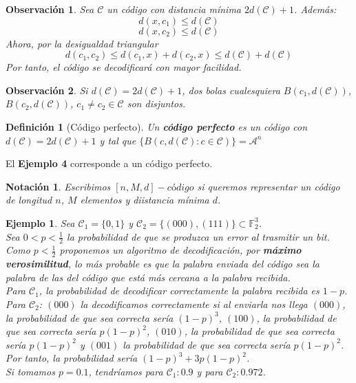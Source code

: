 \documentclass[spanish]{book}
\newtheorem{mydef}{Definición}
\newtheorem{nota}{Notación}
\newtheorem{ejem}{Ejemplo}
\newtheorem{obsv}{Observación}
\begin{document}
\begin{obsv}
	Sea $\mathcal{C}$ un código con distancia mínima $2d(\mathcal{C})+1$.
	Además:
	$$ d(x, c_1) \leq d(\mathcal{C}) $$
	$$ d(x, c_2) \leq d(\mathcal{C}) $$
	Ahora, por la desigualdad triangular $$d(c_1, c_2) \leq d(c_1, x) + d(c_2, x) \leq d(\mathcal{C}) + d(\mathcal{C})$$
	Por tanto, el código se decodificará con mayor facilidad.
\end{obsv}

\begin{obsv}
	Si $d(\mathcal{C})=2d(\mathcal{C})+1$, dos bolas cualesquiera $B(c_1, d(\mathcal{C}))$, $B(c_2, d(\mathcal{C}))$, $c_1 \neq c_2 \in \mathcal{C}$ son disjuntos.
\end{obsv}

\begin{mydef}[Código perfecto]
	Un \textbf{código perfecto} es un código con $d(\mathcal{C})=2d(\mathcal{C})+1$ y tal que $\{B(c, d(\mathcal{C}): c \in \mathcal{C})\}=\mathcal{A}^n$
\end{mydef}

El \textbf{Ejemplo 4} corresponde a un código perfecto.

\begin{nota}
	Escribimos $[n, M, d]-código$ si queremos representar un código de longitud $n$, $M$ elementos y diistancia mínima $d$.
\end{nota}

\begin{ejem}
	Sea $\mathcal{C}_1=\{0, 1\}$ y $\mathcal{C}_2=\{(000), (111)\} \subset \mathbb{F}_2^3$. \\
	Sea $\displaystyle 0<p<\frac{1}{2}$ la probabilidad de que se produzca un error al trasmitir un bit. \\
	Como $\displaystyle p < \frac{1}{2}$ proponemos un algoritmo de decodificación, por \textbf{máximo verosimilitud}, lo más probable es que la palabra enviada del código sea la palabra de las del código que está más cercana a la palabra recibida. \\
	Para $\mathcal{C}_1$, la probabilidad de decodificar correctamente la palabra recibida es $1-p$. \\
	Para $\mathcal{C}_2$:
	 $(000)$ la decodificamos correctamente si al enviarla nos llega $(000)$, la probabilidad de que sea correcta sería $(1-p)^3$, $(100)$, la probabilidad de que sea correcta sería $p(1-p)^2$, $(010)$, la probabilidad de que sea correcta sería $p(1-p)^2$ y $(001)$  la probabilidad de que sea correcta sería $p(1-p)^2$. \\
	Por tanto, la probabilidad sería $(1 - p)^3 + 3 p (1 - p) ^2$. \\
	Si tomamos $p=0.1$, tendríamos para $\mathcal{C}_1: 0.9$ y para $\mathcal{C}_2: 0.972$.
\end{ejem}
\end{document}
